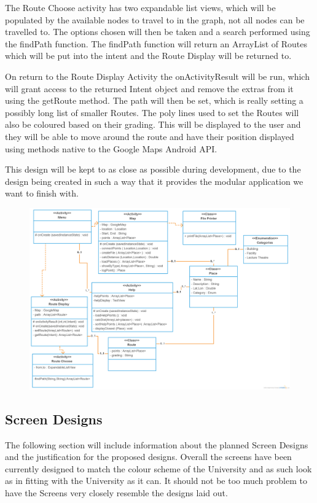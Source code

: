 \documentclass[10pt,a4paper]{article}
\begin{document}
The Route Choose activity has two expandable list views, which will be populated by the available nodes to travel to in the graph, not all nodes can be travelled to. The options chosen will then be taken and a search performed using the findPath function. The findPath function will return an ArrayList of Routes which will be put into the intent and the Route Display will be returned to.

On return to the Route Display Activity the onActivityResult will be run, which will grant access to the returned Intent object and remove the extras from it using the getRoute method. The path will then be set, which is really setting a possibly long list of smaller Routes. The poly lines used to set the Routes will also be coloured based on their grading. This will be displayed to the user and they will be able to move around the route and have their position displayed using methods native to the Google Maps Android API. 

This design will be kept to as close as possible during development, due to the design being created in such a way that it provides the modular application we want to finish with. 
\begin{figure}
\includegraphics[scale=0.29]{Class.png}
\end{figure}
\newpage
\subsection{Screen Designs}
The following section will include information about the planned Screen Designs and the justification for the proposed designs. Overall the screens have been currently designed to match the colour scheme of the University and as such look as in fitting with the University as it can. It should not be too much problem to have the Screens very closely resemble the designs laid out. 
\end{document}
